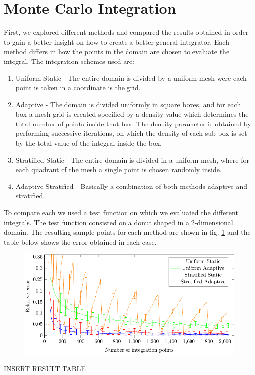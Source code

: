 \section{Monte Carlo Integration}

First, we explored different methods and compared the results obtained
in order to gain a better insight on how to create a better general integrator. Each method differs in how
the points in the domain are chosen to evaluate the integral.
The integration schemes \cite{MCmethods} used are:
\begin{enumerate}
  \item Uniform Static - The entire domain is divided by a uniform mesh were each point is taken in a coordinate is the grid.
  \item Adaptive - The domain is divided uniformly in square boxes, and for each box a mesh grid is created
  specified by a density value which determines the total number of points inside that box. The density parameter
  is obtained by performing successive iterations, on which the density of each sub-box is set by the total value of the integral inside
  the box.
  \item Stratified Static - The entire domain is divided in a uniform mesh, where for each quadrant of the mesh
  a single point is chosen randomly inside.
  \item Adaptive Stratified - Basically a combination of both methods adaptive and stratified.
\end{enumerate}

To compare each we used a test function on which we evaluated the different integrals.
The test function consisted on a donut shaped  in a 2-dimensional domain. The resulting
sample points for each method are shown in fig. \ref{} and the table below shows the error
obtained in each case.

\begin{figure}
  \begin{center}
  \includegraphics[scale=1 ]{graphs/graphtest.pdf}
  \caption{}
  \label{}
  \end{center}
\end{figure}

INSERT RESULT TABLE
